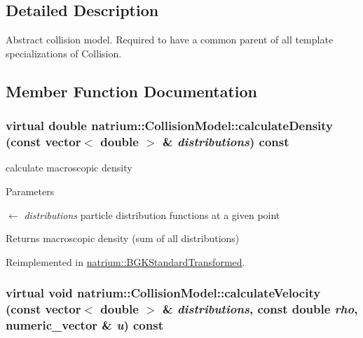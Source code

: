 \subsection{Detailed Description}
Abstract collision model. Required to have a common parent of all template specializations of Collision. 

\subsection{Member Function Documentation}
\hypertarget{classnatrium_1_1CollisionModel_ae1c879c87ac210a227a8e3da2d0ac385}{
\subsubsection[{calculateDensity}]{\setlength{\rightskip}{0pt plus 5cm}virtual double natrium::CollisionModel::calculateDensity (const vector$<$ double $>$ \& {\em distributions}) const}}
\label{classnatrium_1_1CollisionModel_ae1c879c87ac210a227a8e3da2d0ac385}


calculate macroscopic density 
\begin{DoxyParams}{Parameters}
\item[\mbox{$\leftarrow$} {\em distributions}]particle distribution functions at a given point \end{DoxyParams}
\begin{DoxyReturn}{Returns}
macroscopic density (sum of all distributions) 
\end{DoxyReturn}


Reimplemented in \hyperlink{classnatrium_1_1BGKStandardTransformed_a58c4dc0c67ff4898c6555b614afc1ace}{natrium::BGKStandardTransformed}.\hypertarget{classnatrium_1_1CollisionModel_a667f0e36da1bfb1c5102adb8f3afdcde}{
\subsubsection[{calculateVelocity}]{\setlength{\rightskip}{0pt plus 5cm}virtual void natrium::CollisionModel::calculateVelocity (const vector$<$ double $>$ \& {\em distributions}, \/  const double {\em rho}, \/  numeric\_\-vector \& {\em u}) const}}
\label{classnatrium_1_1CollisionModel_a667f0e36da1bfb1c5102adb8f3afdcde}


